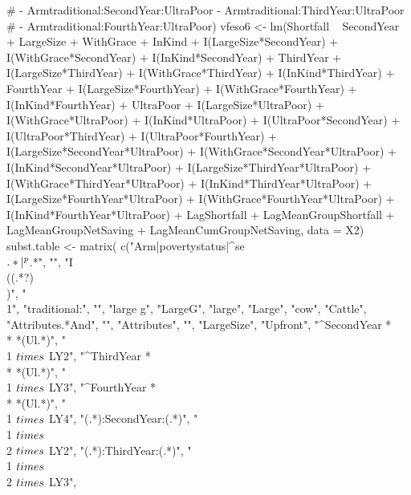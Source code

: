 \begin{Schunk}
\begin{Sinput}
#   - Armtraditional:SecondYear:UltraPoor - Armtraditional:ThirdYear:UltraPoor
#   - Armtraditional:FourthYear:UltraPoor)
vfeso6 <- lm(Shortfall ~ 
  SecondYear + LargeSize + WithGrace + InKind +
  I(LargeSize*SecondYear) + I(WithGrace*SecondYear) + I(InKind*SecondYear) + 
  ThirdYear +
  I(LargeSize*ThirdYear) + I(WithGrace*ThirdYear) + I(InKind*ThirdYear) +
  FourthYear +
  I(LargeSize*FourthYear) + I(WithGrace*FourthYear) + I(InKind*FourthYear) +
  UltraPoor + 
  I(LargeSize*UltraPoor) + I(WithGrace*UltraPoor) + I(InKind*UltraPoor) + 
  I(UltraPoor*SecondYear) + I(UltraPoor*ThirdYear) + I(UltraPoor*FourthYear) +
  I(LargeSize*SecondYear*UltraPoor) + I(WithGrace*SecondYear*UltraPoor) + 
  I(InKind*SecondYear*UltraPoor) + 
  I(LargeSize*ThirdYear*UltraPoor) + I(WithGrace*ThirdYear*UltraPoor) + 
  I(InKind*ThirdYear*UltraPoor) + 
  I(LargeSize*FourthYear*UltraPoor) + I(WithGrace*FourthYear*UltraPoor) + 
  I(InKind*FourthYear*UltraPoor) + 
  LagShortfall + LagMeanGroupShortfall +
  LagMeanGroupNetSaving + LagMeanCumGroupNetSaving,
  data = X2)
subst.table <- matrix(
  c("Arm|povertystatus|^se\\$.*|^p\\$.*", "",
    "I\\((.*?)\\)", "\\1",
    "traditional:", "",
    "large g", "LargeG",
    "large", "Large",
    "cow", "Cattle",
    "Attributes.*And", "",
    "Attributes", "",
    "LargeSize", "Upfront",
    "^SecondYear *\\* *(Ul.*)", "\\1 $\\\\times$ LY2",
    "^ThirdYear *\\* *(Ul.*)", "\\1 $\\\\times$ LY3",
    "^FourthYear *\\* *(Ul.*)", "\\1 $\\\\times$ LY4",
    "(.*):SecondYear:(.*)", "\\1 $\\\\times$ \\2 $\\\\times$ LY2",
    "(.*):ThirdYear:(.*)", "\\1 $\\\\times$ \\2 $\\\\times$ LY3",

\end{Sinput}
\end{Schunk}
